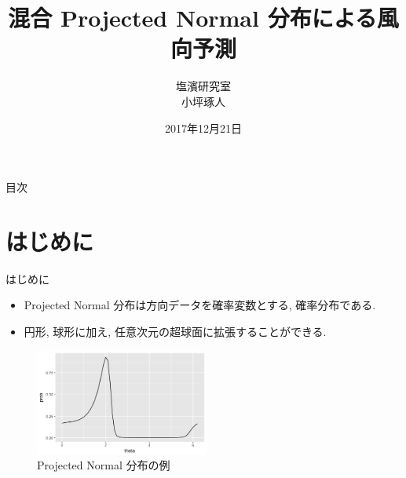 \documentclass[dvipdfmx]{beamer}
\title[タイトル]{混合 Projected Normal 分布による風向予測}
\author[発表者名]{塩濱研究室\\ 小坪琢人}
\institute[所属]{東京理科大学\ 工学部経営工学科4年\\学籍番号 4414036}
\date[日付]{2017年12月21日}
\begin{document}
\begin{frame}[plain]
\titlepage
\end{frame}
	
\begin{frame}{目次}
\tableofcontents
\end{frame}

\section{はじめに}
\begin{frame}{はじめに}

\begin{itemize}

\item Projected Normal 分布は方向データを確率変数とする, 確率分布である.

\item 円形, 球形に加え, 任意次元の超球面に拡張することができる.  \cite{GPN}

\end{itemize}

\vspace{-0.3cm}
\begin{figure}[H]
\begin{center}
\includegraphics[clip,height= 35mm]{data/PN_sample1.png}
\end{center}
\caption{Projected Normal 分布の例}
\label{pnsample1}
\end{figure}

\end{frame}
\end{document}
